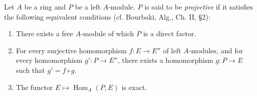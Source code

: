 Let $A$ be a ring and $P$ be a left $A$-module. $P$ is said to be \emph{projective} if it satisfies the following equivalent conditions (cf. Bourbaki, Alg., Ch. II, \S 2):

\begin{enumerate}
\item[(a)] There exists a free $A$-module of which $P$ is a direct factor.
\item[(b)] For every surjective homomorphism $f: E \to E''$ of left $A$-modules, and for every homomorphism $g': P \to E''$, there exists a homomorphism $g: P \to E$ such that $g' = f \circ g$.
\item[(c)] The functor $E \mapsto \operatorname{Hom}_A(P, E)$ is exact.
\end{enumerate}
